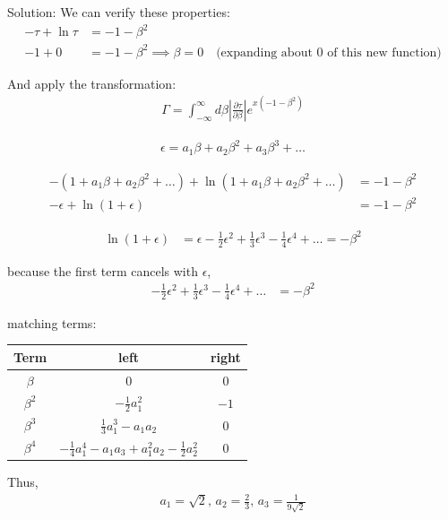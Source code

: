 \begin{homeworkProblem}
\begin{enumerate}
\begin{callout}{Solution:}
We can verify these properties:
\begin{align*}
    -\tau + \ln \tau &= -1 - \beta^{2} \\ 
    -1 + 0 &= -1 - \beta^{2} \implies \beta = 0 \quad \text{(expanding about 0 of this new function)}
\end{align*}

And apply the transformation:
\begin{align*}
    \Gamma = \int_{-\infty}^{\infty} d \beta \left| \frac{\partial \tau}{\partial \beta} \right| e^{x(-1-\beta^{2})}
\end{align*}

\begin{align*}
    \epsilon = a_{1}\beta+a_{2}\beta^{2}+a_{3}\beta^{3}+\dots
\end{align*}

\begin{align*}
    -(1+a_{1}\beta + a_{2}\beta^{2} + \dots) + \ln (1+a_{1}\beta + a_{2}\beta^{2}+\dots) &= -1-\beta^{2} \\
        -\epsilon + \ln(1+\epsilon) &= -1-\beta^{2}
\end{align*}

\begin{align*}
        \ln(1+\epsilon) &= \epsilon - \frac{1}{2} \epsilon^{2} + \frac{1}{3}\epsilon^{3} - \frac{1}{4}\epsilon^{4} + \dots = -\beta^{2}
\end{align*}

because the first term cancels with $\epsilon$, 
\begin{align*}
        - \frac{1}{2} \epsilon^{2} + \frac{1}{3}\epsilon^{3} - \frac{1}{4}\epsilon^{4} + \dots &= -\beta^{2}
\end{align*}

matching terms:
\begin{table}[H]
\centering
\begin{tabular}{c|c|c}
\hline
Term & left & right \\
\hline
$\beta$   & $0$ & $0$ \\
$\beta^2$ & $-\frac{1}{2}a_1^2$ & $-1$ \\
$\beta^3$ & $\frac{1}{3}a_1^3-a_1a_2$ & $0$ \\
$\beta^4$ & $-\frac{1}{4}a_1^4 - a_{1}a_{3} + a_{1}^2a_{2} - \frac{1}{2}a_{2}^2$ & $0$ \\
\hline
\end{tabular}
\end{table}

Thus, 
\begin{align*}
    a_{1}=\sqrt{2},\, a_{2}=\frac{2}{3},\,a_3= \frac{1}{9 \sqrt{2}}
\end{align*}


\end{callout}
\end{enumerate}
\end{homeworkProblem}
